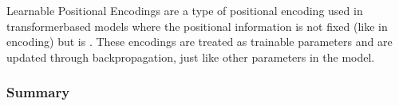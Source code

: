 \documentclass[letterpaper,11pt,english]{sphinxmanual}
\begin{document}
\subsubsection{}
\label{\detokenize{pretraining:learnable-positional-encodings}}
\sphinxAtStartPar
Learnable Positional Encodings are a type of positional encoding used in
transformer\sphinxhyphen{}based models where the positional information is not fixed
(like in  encoding) but is .
These encodings are treated as trainable parameters and are updated
through backpropagation, just like other parameters in the model.


\subsubsection{Summary}
\label{\detokenize{pretraining:summary}}
\end{document}
